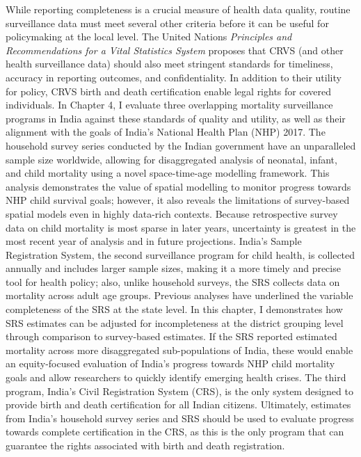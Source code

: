 \documentclass[
]{report}
\begin{document}
While reporting completeness is a crucial measure of health data quality, routine surveillance data must meet several other criteria before it can be useful for policymaking at the local level. The United Nations \emph{Principles and Recommendations for a Vital Statistics System} proposes that CRVS (and other health surveillance data) should also meet stringent standards for timeliness, accuracy in reporting outcomes, and confidentiality.\autocite{UnitedNationsStatisticsDivision2014} In addition to their utility for policy, CRVS birth and death certification enable legal rights for covered individuals.\autocite{Setel2007,Duryea2006} In Chapter 4, I evaluate three overlapping mortality surveillance programs in India against these standards of quality and utility, as well as their alignment with the goals of India's National Health Plan (NHP) 2017. The household survey series conducted by the Indian government have an unparalleled sample size worldwide, allowing for disaggregated analysis of neonatal, infant, and child mortality using a novel space-time-age modelling framework.\autocite{Dandona2016,Dandona2020} This analysis demonstrates the value of spatial modelling to monitor progress towards NHP child survival goals; however, it also reveals the limitations of survey-based spatial models even in highly data-rich contexts. Because retrospective survey data on child mortality is most sparse in later years, uncertainty is greatest in the most recent year of analysis and in future projections. India's Sample Registration System, the second surveillance program for child health, is collected annually and includes larger sample sizes, making it a more timely and precise tool for health policy; also, unlike household surveys, the SRS collects data on mortality across adult age groups.\autocite{CensusofIndia2017} Previous analyses have underlined the variable completeness of the SRS at the state level.\autocite{Bhat2002,Mahapatra2010} In this chapter, I demonstrates how SRS estimates can be adjusted for incompleteness at the district grouping level through comparison to survey-based estimates. If the SRS reported estimated mortality across more disaggregated sub-populations of India, these would enable an equity-focused evaluation of India's progress towards NHP child mortality goals and allow researchers to quickly identify emerging health crises. The third program, India's Civil Registration System (CRS), is the only system designed to provide birth and death certification for all Indian citizens.\autocite{ParliamentoftheRepublicofIndia1969,Mohanty2018} Ultimately, estimates from India's household survey series and SRS should be used to evaluate progress towards complete certification in the CRS, as this is the only program that can guarantee the rights associated with birth and death registration.\autocite{Abouzahr2007}
\end{document}
